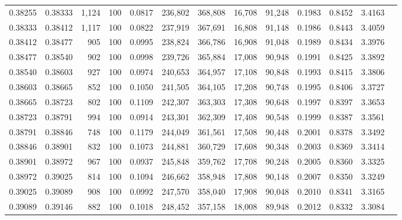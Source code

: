 \begin{tabular}{rrrrrrrrrrrrr}
0.38255 & 0.38333 & 1,124 & 100 &                                     0.0817 & 236,802 & 368,808 &  16,708 &  91,248 & 0.1983 & 0.8452 & 3.4163 \\
0.38333 & 0.38412 & 1,117 & 100 &                                     0.0822 & 237,919 & 367,691 &  16,808 &  91,148 & 0.1986 & 0.8443 & 3.4059 \\
0.38412 & 0.38477 &   905 & 100 &                                     0.0995 & 238,824 & 366,786 &  16,908 &  91,048 & 0.1989 & 0.8434 & 3.3976 \\
0.38477 & 0.38540 &   902 & 100 &                                     0.0998 & 239,726 & 365,884 &  17,008 &  90,948 & 0.1991 & 0.8425 & 3.3892 \\
0.38540 & 0.38603 &   927 & 100 &                                     0.0974 & 240,653 & 364,957 &  17,108 &  90,848 & 0.1993 & 0.8415 & 3.3806 \\
0.38603 & 0.38665 &   852 & 100 &                                     0.1050 & 241,505 & 364,105 &  17,208 &  90,748 & 0.1995 & 0.8406 & 3.3727 \\
0.38665 & 0.38723 &   802 & 100 &                                     0.1109 & 242,307 & 363,303 &  17,308 &  90,648 & 0.1997 & 0.8397 & 3.3653 \\
0.38723 & 0.38791 &   994 & 100 &                                     0.0914 & 243,301 & 362,309 &  17,408 &  90,548 & 0.1999 & 0.8387 & 3.3561 \\
0.38791 & 0.38846 &   748 & 100 &                                     0.1179 & 244,049 & 361,561 &  17,508 &  90,448 & 0.2001 & 0.8378 & 3.3492 \\
0.38846 & 0.38901 &   832 & 100 &                                     0.1073 & 244,881 & 360,729 &  17,608 &  90,348 & 0.2003 & 0.8369 & 3.3414 \\
0.38901 & 0.38972 &   967 & 100 &                                     0.0937 & 245,848 & 359,762 &  17,708 &  90,248 & 0.2005 & 0.8360 & 3.3325 \\
0.38972 & 0.39025 &   814 & 100 &                                     0.1094 & 246,662 & 358,948 &  17,808 &  90,148 & 0.2007 & 0.8350 & 3.3249 \\
0.39025 & 0.39089 &   908 & 100 &                                     0.0992 & 247,570 & 358,040 &  17,908 &  90,048 & 0.2010 & 0.8341 & 3.3165 \\
0.39089 & 0.39146 &   882 & 100 &                                     0.1018 & 248,452 & 357,158 &  18,008 &  89,948 & 0.2012 & 0.8332 & 3.3084 \\

\end{tabular}
